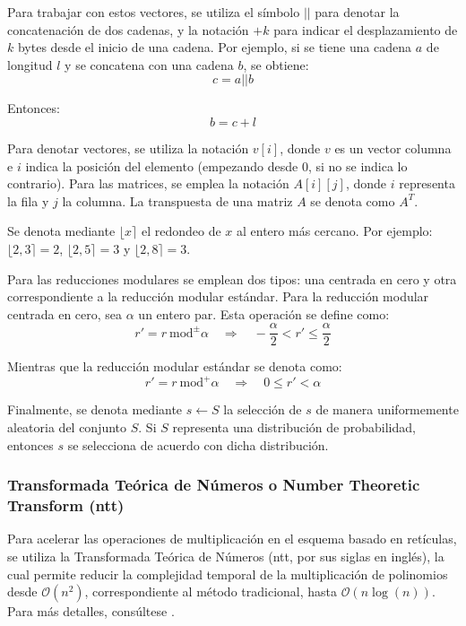 Para trabajar con estos vectores, se utiliza el símbolo \(||\) para denotar la concatenación de dos cadenas, y la notación \(+k\) para indicar el desplazamiento de \(k\) bytes desde el inicio de una cadena. Por ejemplo, si se tiene una cadena \(a\) de longitud \(l\) y se concatena con una cadena \(b\), se obtiene:
\begin{equation}
	c = a || b
\end{equation}

Entonces:
\begin{equation}
	b = c + l
\end{equation}

Para denotar vectores, se utiliza la notación \(v[i]\), donde \(v\) es un vector columna e \(i\) indica la posición del elemento (empezando desde 0, si no se indica lo contrario). Para las matrices, se emplea la notación \(A[i][j]\), donde \(i\) representa la fila y \(j\) la columna. La transpuesta de una matriz \(A\) se denota como \(A^T\).
\newline

Se denota mediante \(\lfloor x \rceil\) el redondeo de \(x\) al entero más cercano. Por ejemplo: \(\lfloor 2{,}3 \rceil = 2\), \(\lfloor 2{,}5 \rceil = 3\) y \(\lfloor 2{,}8 \rceil = 3\).
\newline

Para las reducciones modulares se emplean dos tipos: una centrada en cero y otra correspondiente a la reducción modular estándar. Para la reducción modular centrada en cero, sea \(\alpha\) un entero par. Esta operación se define como:
\begin{equation}
	r' = r \ \text{mod}^{\pm} \alpha \quad \Longrightarrow \quad -\dfrac{\alpha}{2} < r' \le \dfrac{\alpha}{2}
\end{equation}

Mientras que la reducción modular estándar se denota como:
\begin{equation}
	r' = r \ \text{mod}^{+} \alpha \quad \Longrightarrow \quad 0 \le r' < \alpha
\end{equation}

Finalmente, se denota mediante \(s \leftarrow S\) la selección de \(s\) de manera uniformemente aleatoria del conjunto \(S\). Si \(S\) representa una distribución de probabilidad, entonces \(s\) se selecciona de acuerdo con dicha distribución.
\newpage

\subsubsection{Transformada Teórica de Números o Number Theoretic Transform (\gls{ntt})}
Para acelerar las operaciones de multiplicación en el esquema basado en retículas, se utiliza la Transformada Teórica de Números (\gls{ntt}, por sus siglas en inglés), la cual permite reducir la complejidad temporal de la multiplicación de polinomios desde \(\mathcal{O}(n^2)\), correspondiente al método tradicional, hasta \(\mathcal{O}(n \log(n))\). Para más detalles, consúltese \cite{cryptoeprint:2024/585}.
\newline

